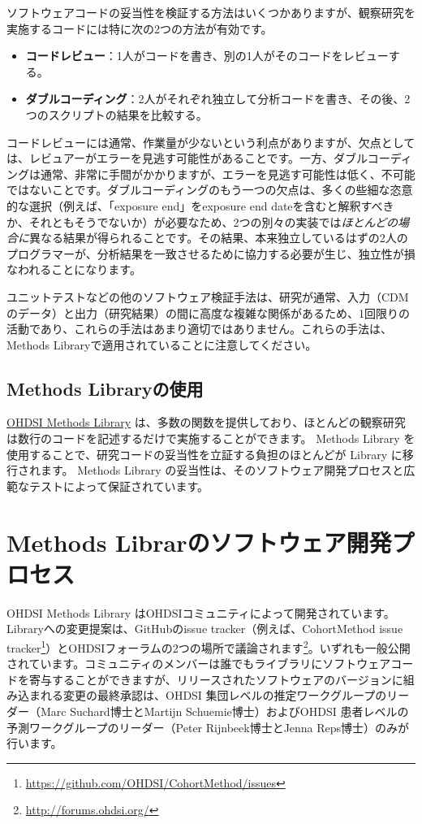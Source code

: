 \documentclass[
  11pt]{book}
\theoremstyle{definition}
\theoremstyle{definition}
\theoremstyle{definition}
\theoremstyle{definition}
\theoremstyle{remark}
\begin{document}
ソフトウェアコードの妥当性を検証する方法はいくつかありますが、観察研究を実施するコードには特に次の2つの方法が有効です。

\begin{itemize}
\item
  \textbf{コードレビュー}：1人がコードを書き、別の1人がそのコードをレビューする。
\item
  \textbf{ダブルコーディング}：2人がそれぞれ独立して分析コードを書き、その後、2つのスクリプトの結果を比較する。
\end{itemize}

コードレビューには通常、作業量が少ないという利点がありますが、欠点としては、レビュアーがエラーを見逃す可能性があることです。一方、ダブルコーディングは通常、非常に手間がかかりますが、エラーを見逃す可能性は低く、不可能ではないことです。ダブルコーディングのもう一つの欠点は、多くの些細な恣意的な選択（例えば、「exposure end」をexposure end dateを含むと解釈すべきか、それともそうでないか）が必要なため、2つの別々の実装では\emph{ほとんどの場合に}異なる結果が得られることです。その結果、本来独立しているはずの2人のプログラマーが、分析結果を一致させるために協力する必要が生じ、独立性が損なわれることになります。

ユニットテストなどの他のソフトウェア検証手法は、研究が通常、入力（CDMのデータ）と出力（研究結果）の間に高度な複雑な関係があるため、1回限りの活動であり、これらの手法はあまり適切ではありません。これらの手法は、Methods Libraryで適用されていることに注意してください。

\subsection{Methods Libraryの使用}\label{methods-libraryux306eux4f7fux7528}

\href{https://ohdsi.github.io/MethodsLibrary/}{OHDSI Methods Library} は、多数の関数を提供しており、ほとんどの観察研究は数行のコードを記述するだけで実施することができます。 Methods Library を使用することで、研究コードの妥当性を立証する負担のほとんどが Library に移行されます。 Methods Library の妥当性は、そのソフトウェア開発プロセスと広範なテストによって保証されています。

\section{Methods Librarのソフトウェア開発プロセス}\label{methods-librarux306eux30bdux30d5ux30c8ux30a6ux30a7ux30a2ux958bux767aux30d7ux30edux30bbux30b9}

OHDSI Methods Library はOHDSIコミュニティによって開発されています。Libraryへの変更提案は、GitHubのissue tracker（例えば、CohortMethod issue tracker\footnote{\url{https://github.com/OHDSI/CohortMethod/issues}}）とOHDSIフォーラムの2つの場所で議論されます\footnote{\url{http://forums.ohdsi.org/}}。いずれも一般公開されています。コミュニティのメンバーは誰でもライブラリにソフトウェアコードを寄与することができますが、リリースされたソフトウェアのバージョンに組み込まれる変更の最終承認は、OHDSI 集団レベルの推定ワークグループのリーダー（Marc Suchard博士とMartijn Schuemie博士）およびOHDSI 患者レベルの予測ワークグループのリーダー（Peter Rijnbeek博士とJenna Reps博士）のみが行います。
\end{document}
